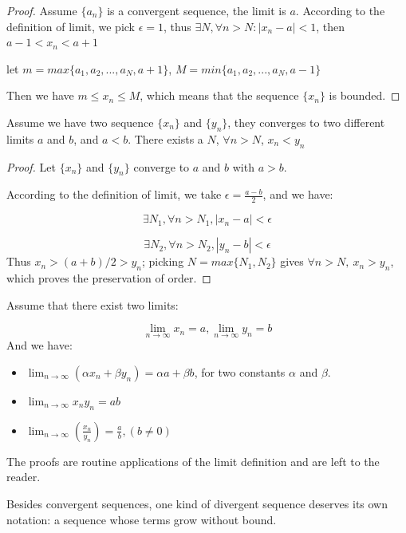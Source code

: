 \begin{proof}
Assume $\{a_n\}$ is a convergent sequence, the limit is $a$. According to the definition of limit, we pick $\epsilon = 1$, thus $\exists N, \forall n > N:|x_n-a|<1$, then $a-1<x_n<a+1$

let $m = max\{a_1, a_2, ..., a_N, a+1\}$, $M = min\{a_1, a_2, ..., a_N, a-1\}$

Then we have $m \leq x_n \leq M$, which means that the sequence $\{x_n\}$ is bounded.
\end{proof}

\begin{theorem}
Assume we have two sequence $\{x_n\}$ and $\{y_n\}$, they converges to two different limits $a$ and $b$, and $a<b$. There exists a $N$, $\forall n>N$, $x_n<y_n$
\end{theorem}

\begin{proof}
Let $\{x_n\}$ and $\{y_n\}$ converge to $a$ and $b$ with $a>b$.

According to the definition of limit, we take $\epsilon = \frac{a-b}{2}$, and we have:

\[
\exists N_1, \forall n>N_1, |x_n-a| < \epsilon
\]

\[
\exists N_2, \forall n>N_2, |y_n-b| < \epsilon
\]
Thus $x_n > (a+b)/2 > y_n$; picking $N = max \{N_1,N_2\}$ gives $\forall n > N,\ x_n>y_n$, which proves the preservation of order.
\end{proof}



\begin{theorem}

Assume that there exist two limits:

\[\lim_{n \to \infty} x_n = a, \lim_{n \to \infty} y_n = b\]
And we have:
\begin{itemize}
    \item $\lim_{n \to \infty} (\alpha x_n + \beta y_n) = \alpha a + \beta b$, for two constants $\alpha$ and $\beta$.
    \item $\lim_{n \to \infty} x_ny_n = ab$
    \item $\lim_{n \to \infty} (\frac{x_n}{y_n}) = \frac{a}{b},(b\neq0)$
\end{itemize}
\end{theorem}
The proofs are routine applications of the limit definition and are left to the reader.

Besides convergent sequences, one kind of divergent sequence deserves its own notation: a sequence whose terms grow without bound.

